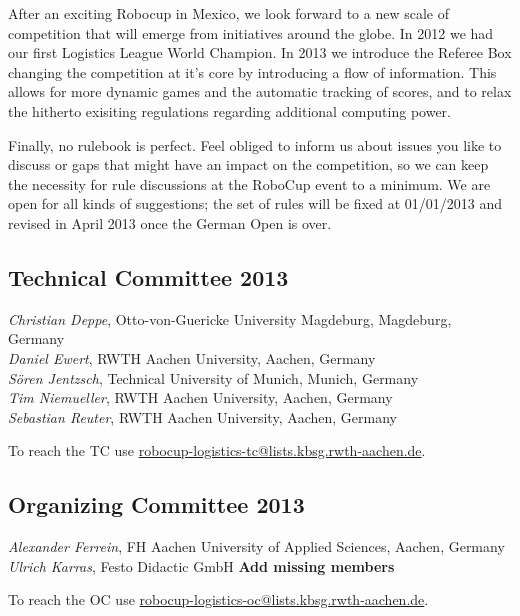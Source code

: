 \documentclass[12pt,twoside]{article}
\begin{document}
After an exciting Robocup in Mexico, we look forward to a new scale of
competition that will emerge from initiatives around the globe. In
2012 we had our first Logistics League World Champion.  In 2013 we
introduce the Referee Box changing the competition at it's core by
introducing a flow of information.  This allows for more dynamic games
and the automatic tracking of scores, and to relax the hitherto
exisiting regulations regarding additional computing power.

Finally, no rulebook is perfect. Feel obliged to inform us about
issues you like to discuss or gaps that might have an impact on the
competition, so we can keep the necessity for rule discussions at the
RoboCup event to a minimum. We are open for all kinds of suggestions;
the set of rules will be fixed at 01/01/2013 and revised in April 2013
once the German Open is over.

\subsection*{Technical Committee 2013}
\emph{Christian Deppe}, Otto-von-Guericke University Magdeburg, Magdeburg,
Germany\\
\emph{Daniel Ewert}, RWTH Aachen University, Aachen, Germany\\
\emph{S\"oren Jentzsch}, Technical University of Munich, Munich, Germany\\
\emph{Tim Niemueller}, RWTH Aachen University, Aachen, Germany\\
\emph{Sebastian Reuter}, RWTH Aachen University, Aachen, Germany

\medskip

\hspace{-\parindent}To reach the TC use
\url{robocup-logistics-tc@lists.kbsg.rwth-aachen.de}.

\subsection*{Organizing Committee 2013}
\emph{Alexander Ferrein}, FH Aachen University of Applied Sciences,
Aachen, Germany\\
\emph{Ulrich Karras}, Festo Didactic GmbH
\textbf{Add missing members}

\medskip

\hspace{-\parindent}To reach the OC use
\url{robocup-logistics-oc@lists.kbsg.rwth-aachen.de}.

\end{document}
